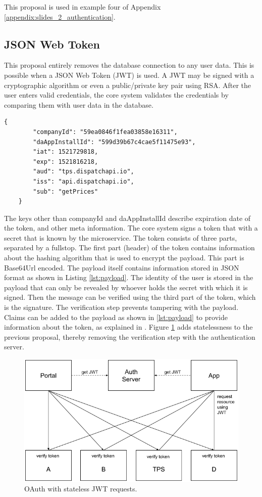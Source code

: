 This proposal is used in example four of Appendix \ref{appendix:slides_2_authentication}.

\subsection{JSON Web Token}
This proposal entirely removes the database connection to any user data. This is possible when a JSON Web Token (JWT) is used. A JWT may be signed with a cryptographic algorithm or even a public/private key pair using RSA. After the user enters valid credentials, the core system validates the credentials by comparing them with user data in the database.

\begin{lstlisting}[caption={Two user identifiers and registered claim names stored inside the payload of a JSON web token.}, label={lst:payload}]
	{
		"companyId": "59ea0846f1fea03858e16311",
		"daAppInstallId": "599d39b67c4cae5f11475e93",
		"iat": 1521729818,
		"exp": 1521816218,
		"aud": "tps.dispatchapi.io",
		"iss": "api.dispatchapi.io",
		"sub": "getPrices"
	}
\end{lstlisting}

The keys other than companyId and daAppInstallId describe expiration date of the token, and other meta information. The core system signs a token that with a secret that is known by the microservice. The token consists of three parts, separated by a fullstop. The first part (header) of the token contains information about the hashing algorithm that is used to encrypt the payload. This part is Base64Url encoded. The payload itself contains information stored in JSON format as shown in Listing \ref{lst:payload}. The identity of the user is stored in the payload that can only be revealed by whoever holds the secret with which it is signed. Then the message can be verified using the third part of the token, which is the signature. The verification step prevents tampering with the payload. Claims can be added to the payload as shown in \ref{lst:payload} to provide information about the token, as explained in \cite{JWT}. Figure \ref{fig:Auth2} adds statelessness to the previous proposal, thereby removing the verification step with the authentication server.

\begin{figure}[H]
	\centering
	\includegraphics[width=.7\textwidth]{Auth2}
	\caption[Stateless JWT]{OAuth with stateless JWT requests.}
	\label{fig:Auth2}
\end{figure}

